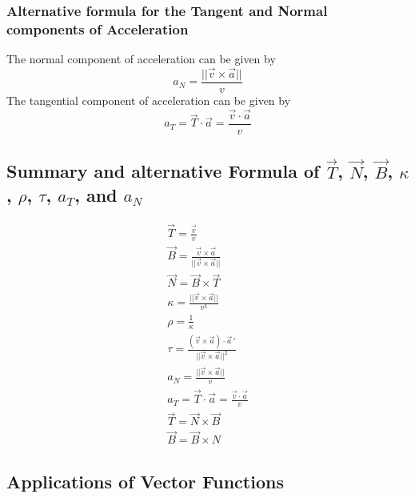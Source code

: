 \documentclass[14pt]{article}
\begin{document}
    \subsubsection{Alternative formula for the Tangent and Normal components of Acceleration}
    The normal component of acceleration can be given by
    $$a_N=\frac{||\vec v\times \vec a||}{v}$$
    The tangential component of acceleration can be given by
    $$a_T=\vec T\cdot\vec a =\frac{\vec v\cdot \vec a}{v}$$
    \subsection{Summary and alternative Formula of $\vec T$, $\vec N$, $\vec B$, $\kappa$, $\rho$, $\tau$, $a_T$, and $a_N$}
    \begin{align}
        \vec T=\frac{\vec v}{v}\\
        \vec B=\frac{\vec v\times\vec a}{||\vec v\times \vec a||}\\
        \vec N=\vec B\times \vec T\\
        \kappa=\frac{||\vec v\times \vec a||}{v^3}\\
        \rho=\frac{1}{\kappa}\\
        \tau=\frac{(\vec v\times \vec a)\cdot\vec a\, '}{||\vec v\times \vec a||^2}\\
        a_N=\frac{||\vec v\times \vec a||}{v}\\
        a_T=\vec T\cdot\vec a =\frac{\vec v\cdot \vec a}{v}\\
        \vec T=\vec N\times\vec B\\
        \vec B=\vec B\times N
    \end{align}
    \subsection{Applications of Vector Functions}
\end{document}
